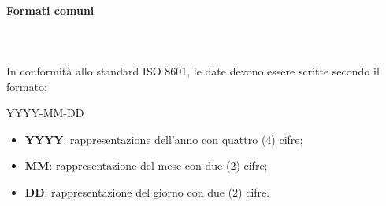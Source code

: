 		\paragraph{Formati comuni} \mbox{}\\ \mbox{}\\
		In conformità allo standard ISO 8601, le date devono essere scritte secondo il formato: \newline \newline
		\centerline{YYYY-MM-DD}
		\begin{itemize}
			\item \textbf{YYYY}: rappresentazione dell'anno con quattro (4) cifre;
			\item\textbf{MM}: rappresentazione del mese con due (2) cifre;
			\item \textbf{DD}: rappresentazione del giorno con due (2) cifre.			
		\end{itemize}
